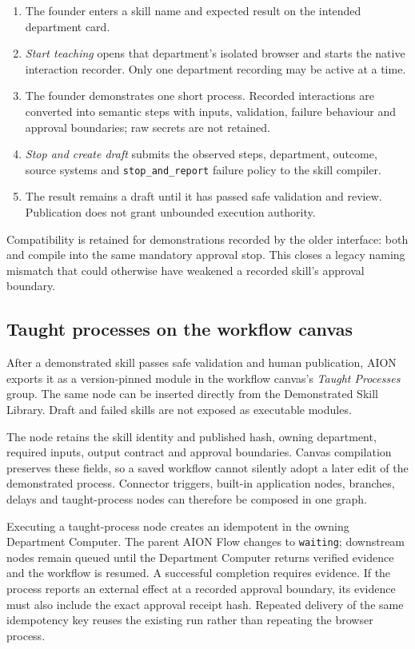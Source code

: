 \begin{enumerate}[leftmargin=*]
\item The founder enters a skill name and expected result on the intended
department card.
\item \emph{Start teaching} opens that department's isolated browser and starts
the native interaction recorder. Only one department recording may be active
at a time.
\item The founder demonstrates one short process. Recorded interactions are
converted into semantic steps with inputs, validation, failure behaviour and
approval boundaries; raw secrets are not retained.
\item \emph{Stop and create draft} submits the observed steps, department,
outcome, source systems and \texttt{stop\_and\_report} failure policy to the
skill compiler.
\item The result remains a draft until it has passed safe validation and
review. Publication does not grant unbounded execution authority.
\end{enumerate}

Compatibility is retained for demonstrations recorded by the older interface:
both  and  compile into
the same mandatory approval stop. This closes a legacy naming mismatch that
could otherwise have weakened a recorded skill's approval boundary.

\subsection*{Taught processes on the workflow canvas}

After a demonstrated skill passes safe validation and human publication, AION
exports it as a version-pinned module in the workflow canvas's \emph{Taught
Processes} group. The same node can be inserted directly from the Demonstrated
Skill Library. Draft and failed skills are not exposed as executable modules.

The node retains the skill identity and published hash, owning department,
required inputs, output contract and approval boundaries. Canvas compilation
preserves these fields, so a saved workflow cannot silently adopt a later edit
of the demonstrated process. Connector triggers, built-in application nodes,
branches, delays and taught-process nodes can therefore be composed in one
graph.

Executing a taught-process node creates an idempotent
 in the owning Department Computer. The parent AION
Flow changes to \texttt{waiting}; downstream nodes remain queued until the
Department Computer returns verified evidence and the workflow is resumed.
A successful completion requires evidence. If the process reports an external
effect at a recorded approval boundary, its evidence must also include the
exact approval receipt hash. Repeated delivery of the same idempotency key
reuses the existing run rather than repeating the browser process.

